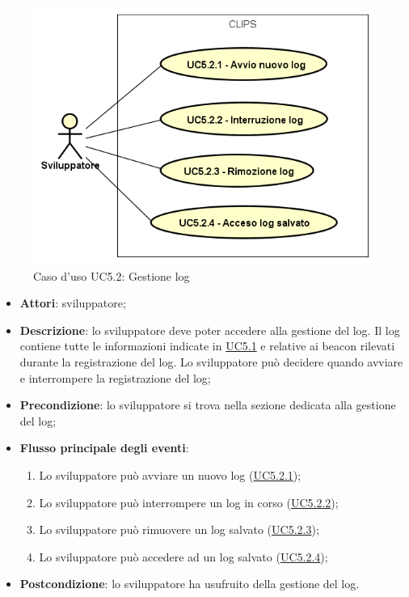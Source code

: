 \documentclass[../AnalisiDeiRequisiti.tex]{subfiles}
\begin{document}
        \begin{figure}[!h]
            \centering
            \includegraphics[scale=0.95, width=\textwidth]{img/UC5-2.png}
            \caption{Caso d'uso UC5.2: Gestione log}\label{fig:UC5.2} 
        \end{figure}
\begin{itemize}
\item \textbf{Attori}: sviluppatore;
\item \textbf{Descrizione}: lo sviluppatore deve poter accedere alla gestione del log. Il log contiene tutte le informazioni indicate in \hyperlink{UC5.1}{UC5.1} e relative ai beacon rilevati durante la registrazione del log. Lo sviluppatore può decidere quando avviare e interrompere la registrazione del log; 
      \item \textbf{Precondizione}: lo sviluppatore si trova nella sezione dedicata alla gestione del log;

        \item \textbf{Flusso principale degli eventi}:
          \begin{enumerate}
          \item Lo sviluppatore può avviare un nuovo log (\hyperlink{UC5.2.1}{UC5.2.1});
          \item Lo sviluppatore può interrompere un log in corso (\hyperlink{UC5.2.2}{UC5.2.2});
          \item Lo sviluppatore può rimuovere un log salvato (\hyperlink{UC5.2.3}{UC5.2.3});
          \item Lo sviluppatore può accedere ad un log salvato (\hyperlink{UC5.2.4}{UC5.2.4});

      \end{enumerate}
    \item \textbf{Postcondizione}: lo sviluppatore ha usufruito della gestione del log.
  \end{itemize}
\hypertarget{UC5.2.1}{}
\end{document}
